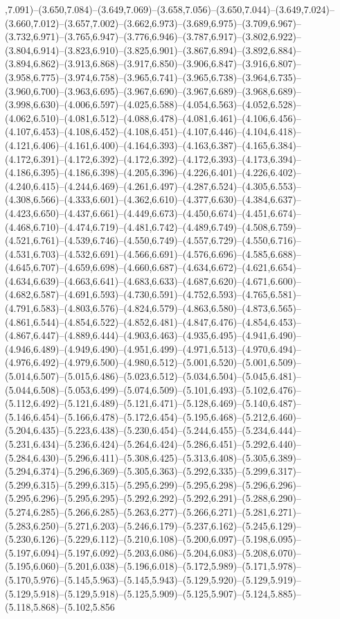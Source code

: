 ,7.091)--(3.650,7.084)--(3.649,7.069)--(3.658,7.056)--(3.650,7.044)--(3.649,7.024)--(3.660,7.012)--(3.657,7.002)--(3.662,6.973)--(3.689,6.975)--(3.709,6.967)--(3.732,6.971)--(3.765,6.947)--(3.776,6.946)--(3.787,6.917)--(3.802,6.922)--(3.804,6.914)--(3.823,6.910)--(3.825,6.901)--(3.867,6.894)--(3.892,6.884)--(3.894,6.862)--(3.913,6.868)--(3.917,6.850)--(3.906,6.847)--(3.916,6.807)--(3.958,6.775)--(3.974,6.758)--(3.965,6.741)--(3.965,6.738)--(3.964,6.735)--(3.960,6.700)--(3.963,6.695)--(3.967,6.690)--(3.967,6.689)--(3.968,6.689)--(3.998,6.630)--(4.006,6.597)--(4.025,6.588)--(4.054,6.563)--(4.052,6.528)--(4.062,6.510)--(4.081,6.512)--(4.088,6.478)--(4.081,6.461)--(4.106,6.456)--(4.107,6.453)--(4.108,6.452)--(4.108,6.451)--(4.107,6.446)--(4.104,6.418)--(4.121,6.406)--(4.161,6.400)--(4.164,6.393)--(4.163,6.387)--(4.165,6.384)--(4.172,6.391)--(4.172,6.392)--(4.172,6.392)--(4.172,6.393)--(4.173,6.394)--(4.186,6.395)--(4.186,6.398)--(4.205,6.396)--(4.226,6.401)--(4.226,6.402)--(4.240,6.415)--(4.244,6.469)--(4.261,6.497)--(4.287,6.524)--(4.305,6.553)--(4.308,6.566)--(4.333,6.601)--(4.362,6.610)--(4.377,6.630)--(4.384,6.637)--(4.423,6.650)--(4.437,6.661)--(4.449,6.673)--(4.450,6.674)--(4.451,6.674)--(4.468,6.710)--(4.474,6.719)--(4.481,6.742)--(4.489,6.749)--(4.508,6.759)--(4.521,6.761)--(4.539,6.746)--(4.550,6.749)--(4.557,6.729)--(4.550,6.716)--(4.531,6.703)--(4.532,6.691)--(4.566,6.691)--(4.576,6.696)--(4.585,6.688)--(4.645,6.707)--(4.659,6.698)--(4.660,6.687)--(4.634,6.672)--(4.621,6.654)--(4.634,6.639)--(4.663,6.641)--(4.683,6.633)--(4.687,6.620)--(4.671,6.600)--(4.682,6.587)--(4.691,6.593)--(4.730,6.591)--(4.752,6.593)--(4.765,6.581)--(4.791,6.583)--(4.803,6.576)--(4.824,6.579)--(4.863,6.580)--(4.873,6.565)--(4.861,6.544)--(4.854,6.522)--(4.852,6.481)--(4.847,6.476)--(4.854,6.453)--(4.867,6.447)--(4.889,6.444)--(4.903,6.463)--(4.935,6.495)--(4.941,6.490)--(4.946,6.489)--(4.949,6.490)--(4.951,6.499)--(4.971,6.513)--(4.970,6.494)--(4.976,6.492)--(4.979,6.500)--(4.980,6.512)--(5.001,6.520)--(5.001,6.509)--(5.014,6.507)--(5.015,6.486)--(5.023,6.512)--(5.034,6.504)--(5.045,6.481)--(5.044,6.508)--(5.053,6.499)--(5.074,6.509)--(5.101,6.493)--(5.102,6.476)--(5.112,6.492)--(5.121,6.489)--(5.121,6.471)--(5.128,6.469)--(5.140,6.487)--(5.146,6.454)--(5.166,6.478)--(5.172,6.454)--(5.195,6.468)--(5.212,6.460)--(5.204,6.435)--(5.223,6.438)--(5.230,6.454)--(5.244,6.455)--(5.234,6.444)--(5.231,6.434)--(5.236,6.424)--(5.264,6.424)--(5.286,6.451)--(5.292,6.440)--(5.284,6.430)--(5.296,6.411)--(5.308,6.425)--(5.313,6.408)--(5.305,6.389)--(5.294,6.374)--(5.296,6.369)--(5.305,6.363)--(5.292,6.335)--(5.299,6.317)--(5.299,6.315)--(5.299,6.315)--(5.295,6.299)--(5.295,6.298)--(5.296,6.296)--(5.295,6.296)--(5.295,6.295)--(5.292,6.292)--(5.292,6.291)--(5.288,6.290)--(5.274,6.285)--(5.266,6.285)--(5.263,6.277)--(5.266,6.271)--(5.281,6.271)--(5.283,6.250)--(5.271,6.203)--(5.246,6.179)--(5.237,6.162)--(5.245,6.129)--(5.230,6.126)--(5.229,6.112)--(5.210,6.108)--(5.200,6.097)--(5.198,6.095)--(5.197,6.094)--(5.197,6.092)--(5.203,6.086)--(5.204,6.083)--(5.208,6.070)--(5.195,6.060)--(5.201,6.038)--(5.196,6.018)--(5.172,5.989)--(5.171,5.978)--(5.170,5.976)--(5.145,5.963)--(5.145,5.943)--(5.129,5.920)--(5.129,5.919)--(5.129,5.918)--(5.129,5.918)--(5.125,5.909)--(5.125,5.907)--(5.124,5.885)--(5.118,5.868)--(5.102,5.856